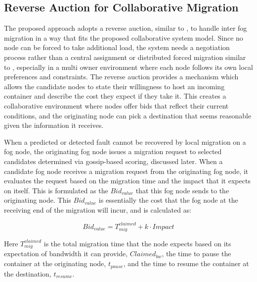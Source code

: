 \documentclass{article}
\begin{document}
\subsection{Reverse Auction for Collaborative Migration}

The proposed approach adopts a reverse auction, similar to \cite{kumarFairResourceAllocation2021, heOnlineAuctionbasedIncentive2022}, to handle inter fog migration in a way that fits the proposed collaborative system model. Since no node can be forced to take additional load, the system needs a negotiation process rather than a central assignment or distributed forced migration similar to \cite{sharifFaulttolerantLoadBalancing2020, knFaultToleranceFog2025, tranProactiveStatefulFaultTolerant2022}, especially in a multi owner environment where each node follows its own local preferences and constraints. The reverse auction provides a mechanism which allows the candidate nodes to state their willingness to host an incoming container and describe the cost they expect if they take it. This creates a collaborative environment where nodes offer bids that reflect their current conditions, and the originating node can pick a destination that seems reasonable given the information it receives. 

When a predicted or detected fault cannot be recovered by local migration on a fog node, the originating fog node issues a migration request to selected candidates determined via gossip-based scoring, discussed later. When a candidate fog node receives a migration request from the originating fog node, it evaluates the request based on the migration time and the impact that it expects on itself. This is formulated as the $Bid_{value}$ that this fog node sends to the originating node. This $Bid_{value}$ is essentially the cost that the fog node at the receiving end of the migration will incur, and is calculated as:

\begin{equation}
Bid_{value}=T^{claimed}_{mig}+k\cdot Impact
\label{eq:bid_value}
\end{equation}

Here $T^{claimed}_{mig}$ is the total migration time that the node expects based on its expectation of bandwidth it can provide, \(Claimed_{bw}\), the time to pause the container at the originating node, $t_{pause}$, and the time to resume the container at the destination, $t_{resume}$.
\end{document}
